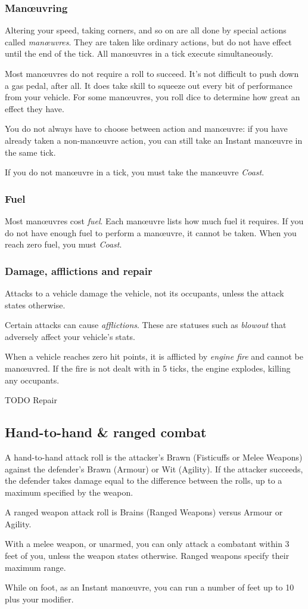 \documentclass[10pt, a4paper, twocolumn]{article}
\begin{document}
\subsubsection{Man\oe{}uvring}
Altering your speed, taking corners, and so on are all done by special actions
called \emph{man\oe{}uvres}. They are taken like ordinary actions, but do not
have effect until the end of the tick. All man\oe{}uvres in a tick execute
simultaneously. 

Most man\oe{}uvres do not require a roll to succeed. It's not difficult to push
down a gas pedal, after all. It does take skill to squeeze out every bit of
performance from your vehicle. For some man\oe{}uvres, you roll dice to
determine how great an effect they have.

You do not always have to choose between action and man\oe{}uvre: if you have
already taken a non-man\oe{}uvre action, you can still take an Instant
man\oe{}uvre in the same tick.

If you do not man\oe{}uvre in a tick, you must take the man\oe{}uvre
\emph{Coast}.

\subsubsection{Fuel}
Most man\oe{}uvres cost \emph{fuel}. Each man\oe{}uvre lists how much fuel it
requires. If you do not have enough fuel to perform a man\oe{}uvre, it cannot be
taken. When you reach zero fuel, you must \emph{Coast}.

\subsubsection{Damage, afflictions and repair}
Attacks to a vehicle damage the vehicle, not its occupants, unless the attack
states otherwise.

Certain attacks can cause \emph{afflictions}. These are statuses such as
\emph{blowout} that adversely affect your vehicle's stats.

When a vehicle reaches zero hit points, it is afflicted by \emph{engine fire}
and cannot be man\oe{}uvred. If the fire is not dealt with in 5 ticks, the
engine explodes, killing any occupants.

TODO Repair

\subsection{Hand-to-hand \& ranged combat}
A hand-to-hand attack roll is the attacker's Brawn (Fisticuffs or Melee Weapons)
against the defender's Brawn (Armour) or Wit (Agility). If the attacker
succeeds, the defender takes damage equal to the difference between the rolls,
up to a maximum specified by the weapon. 

A ranged weapon attack roll is Brains (Ranged Weapons) versus Armour or Agility.

With a melee weapon, or unarmed, you can only attack a combatant within 3 feet
of you, unless the weapon states otherwise. Ranged weapons specify their maximum
range. 

While on foot, as an Instant man\oe{}uvre, you can run a number of feet up to 10
plus your  modifier.
\end{document}
